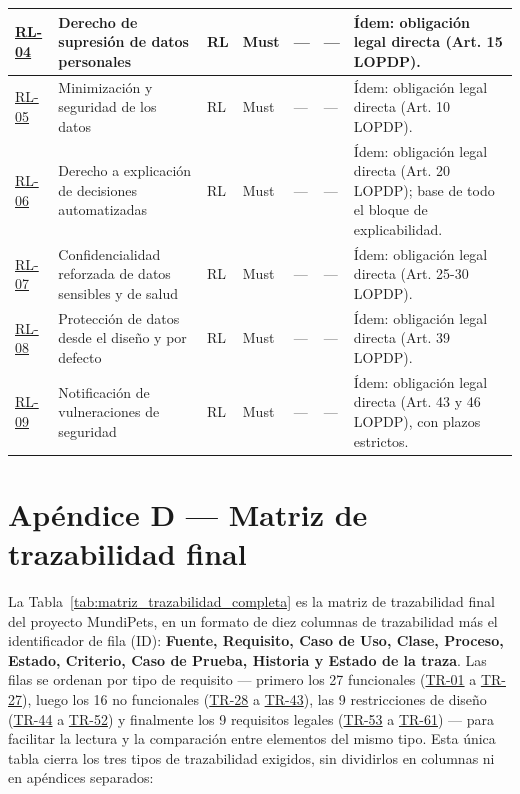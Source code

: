 \documentclass[journal,onecolumn]{IEEEtran}
\begin{document}
\begin{landscape}
\begin{longtable}{@{}p{1.2cm} p{5.2cm} p{1.0cm} p{1.3cm} p{1.3cm} p{1.1cm} p{6.5cm}@{}}
			\hyperref[rl:04]{RL-04} & Derecho de supresión de datos personales & RL & Must & --- & --- & Ídem: obligación legal directa (Art. 15 LOPDP). \\ \midrule
			\hyperref[rl:05]{RL-05} & Minimización y seguridad de los datos & RL & Must & --- & --- & Ídem: obligación legal directa (Art. 10 LOPDP). \\ \midrule
			\hyperref[rl:06]{RL-06} & Derecho a explicación de decisiones automatizadas & RL & Must & --- & --- & Ídem: obligación legal directa (Art. 20 LOPDP); base de todo el bloque de explicabilidad. \\ \midrule
			\hyperref[rl:07]{RL-07} & Confidencialidad reforzada de datos sensibles y de salud & RL & Must & --- & --- & Ídem: obligación legal directa (Art. 25-30 LOPDP). \\ \midrule
			\hyperref[rl:08]{RL-08} & Protección de datos desde el diseño y por defecto & RL & Must & --- & --- & Ídem: obligación legal directa (Art. 39 LOPDP). \\ \midrule
			\hyperref[rl:09]{RL-09} & Notificación de vulneraciones de seguridad & RL & Must & --- & --- & Ídem: obligación legal directa (Art. 43 y 46 LOPDP), con plazos estrictos. \\
		\end{longtable}
	\end{landscape}
	
\section*{Apéndice D --- Matriz de trazabilidad final}
\label{ap:trazabilidad}

La Tabla~\ref{tab:matriz_trazabilidad_completa} es la matriz de trazabilidad
final del proyecto MundiPets, en un formato de diez columnas de trazabilidad más el identificador de fila (ID):
\textbf{Fuente, Requisito, Caso
de Uso, Clase, Proceso, Estado, Criterio, Caso de Prueba, Historia y Estado
de la traza}. Las filas se ordenan por tipo de requisito --- primero los 27
funcionales (\hyperref[tr:01]{TR-01} a \hyperref[tr:27]{TR-27}), luego los 16 no funcionales (\hyperref[tr:28]{TR-28} a \hyperref[tr:43]{TR-43}),
las 9 restricciones de diseño (\hyperref[tr:44]{TR-44} a \hyperref[tr:52]{TR-52}) y finalmente los 9 requisitos
legales (\hyperref[tr:53]{TR-53} a \hyperref[tr:61]{TR-61}) --- para facilitar la lectura y la comparación entre
elementos del mismo tipo. Esta única tabla cierra los tres tipos de
trazabilidad exigidos, sin dividirlos en columnas ni en apéndices
separados:
\end{document}
